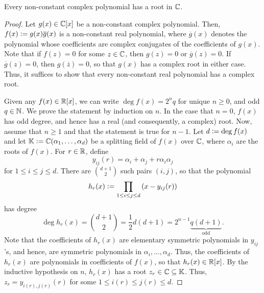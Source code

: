 \begin{theorem} \label{thm:FTA-sym}
    Every non-constant complex polynomial has a root in $\mathbb{C}$.
\end{theorem}
\begin{proof}
    Let $g(x) \in \mathbb{C}[x]$ be a non-constant complex polynomial. Then, $f(x) \vcentcolon= g(x) \overline{g}(x)$ is a non-constant real polynomial, where $\overline{g}(x)$ denotes the polynomial whose coefficients are complex conjugates of the coefficients of $g(x)$. Note that if $f(z) = 0$ for some $z \in \mathbb{C}$, then $g(z) = 0$ or $\overline{g}(z) = 0$. If $\overline{g}(z) = 0$, then $g(\overline{z}) = 0$, so that $g(x)$ has a complex root in either case. Thus, it suffices to show that every non-constant real polynomial has a complex root. 
    
    Given any $f(x) \in \mathbb{R}[x]$, we can write $\deg f(x) = 2^nq$ for unique $n \geq 0$, and odd $q \in \mathbb{N}$. We prove the statement by induction on $n$. In the case that $n =0$, $f(x)$ has odd degree, and hence has a real (and consequently, a complex) root. Now, assume that $n \geq 1$ and that the statement is true for $n-1$. Let $d \vcentcolon= \deg f(x)$ and let $\mathbb{K} \vcentcolon= \mathbb{C}(\alpha_1, \ldots, \alpha_d)$ be a splitting field of $f(x)$ over $\mathbb{C}$, where $\alpha_i$ are the roots of $f(x)$. For $r \in \mathbb{R}$, define
    \[
        y_{ij}(r) = \alpha_i + \alpha_j + r\alpha_i\alpha_j
    \]
    for $1 \leq i \leq j \leq d$. There are $\binom{d+1}{2}$ such pairs $(i,j)$, so that the polynomial
    \[
        h_r(x) \vcentcolon= \prod_{1\leq i\leq j\leq d} \, (x- y_{ij}(r))
    \]
    has degree
    \[
        \deg h_r(x) = \binom{d+1}{2} = \frac{1}{2} d(d+1) = 2^{n-1} \underbrace{q(d+1)}_{\text{odd}}.
    \]
    Note that the coefficients of $h_r(x)$ are elementary symmetric polynomials in $y_{ij}$'s, and hence, are symmetric polynomials in $\alpha_i,\ldots,\alpha_d$. Thus, the coefficients of $h_r(x)$ are polynomials in coefficients of $f(x)$, so that $h_r(x) \in \mathbb{R}[x]$. By the inductive hypothesis on $n$, $h_r(x)$ has a root $z_r \in \mathbb{C} \subseteq \mathbb{K}$. Thus, $z_r = y_{i(r), j(r)}(r)$ for some $1 \leq i(r) \leq j(r) \leq d$. 
    

\end{proof}
